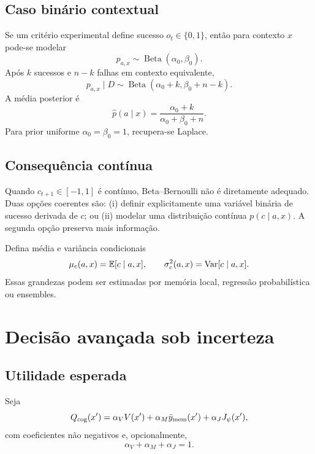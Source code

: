 \subsection{Caso binário contextual}

Se um critério experimental define sucesso \(o_t\in\{0,1\}\), então para contexto \(x\) pode-se modelar
\begin{equation}
p_{a,x}\sim\operatorname{Beta}(\alpha_0,\beta_0).
\end{equation}
Após \(k\) sucessos e \(n-k\) falhas em contexto equivalente,
\begin{equation}
p_{a,x}\mid D
\sim\operatorname{Beta}(\alpha_0+k,\beta_0+n-k).
\end{equation}
A média posterior é
\begin{equation}
\widehat p(a\mid x)=
\frac{\alpha_0+k}{\alpha_0+\beta_0+n}.
\end{equation}
Para prior uniforme \(\alpha_0=\beta_0=1\), recupera-se Laplace.

\subsection{Consequência contínua}

Quando \(c_{t+1}\in[-1,1]\) é contínuo, Beta--Bernoulli não é diretamente adequado. Duas opções coerentes são: (i) definir explicitamente uma variável binária de sucesso derivada de \(c\); ou (ii) modelar uma distribuição contínua \(p(c\mid a,x)\). A segunda opção preserva mais informação.

Defina média e variância condicionais
\begin{equation}
\mu_c(a,x)=\operatorname{\mathbb{E}}[c\mid a,x],
\qquad
\sigma_c^2(a,x)=\operatorname{Var}[c\mid a,x].
\end{equation}
Essas grandezas podem ser estimadas por memória local, regressão probabilística ou ensembles.

\section{Decisão avançada sob incerteza}

\subsection{Utilidade esperada}

Seja
\begin{equation}
Q_{\rm cog}(x')=
\alpha_VV(x')+
\alpha_M\bar y_{\rm mem}(x')+
\alpha_JJ_\psi(x'),
\end{equation}
com coeficientes não negativos e, opcionalmente,
\begin{equation}
\alpha_V+\alpha_M+\alpha_J=1.
\end{equation}


